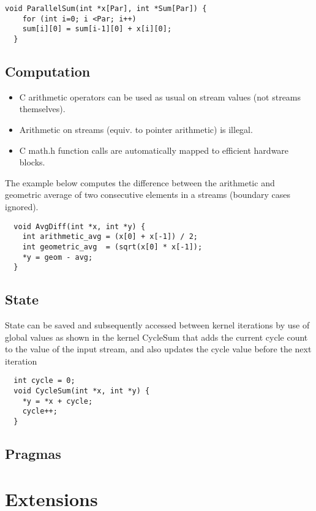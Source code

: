 \begin{lstlisting}[caption={Using loops for \FAST{} design parametrisation}]
  void ParallelSum(int *x[Par], int *Sum[Par]) {
    for (int i=0; i <Par; i++)
    sum[i][0] = sum[i-1][0] + x[i][0];
  }
\end{lstlisting}
\subsection{Computation}

\begin{itemize}

\item C arithmetic operators can be used as usual on stream values (not streams themselves).
\item Arithmetic on streams (equiv. to pointer arithmetic) is illegal.
\item C math.h function calls are automatically mapped to efficient hardware blocks.

\end{itemize}

The example below computes the difference between the arithmetic and geometric average of two consecutive elements in a streams (boundary cases ignored).


\begin{lstlisting}
  void AvgDiff(int *x, int *y) {
    int arithmetic_avg = (x[0] + x[-1]) / 2;
    int geometric_avg  = (sqrt(x[0] * x[-1]);
    *y = geom - avg;
  }
\end{lstlisting}

\subsection{State}
State can be saved and subsequently accessed between kernel iterations
by use of global values as shown in the kernel CycleSum that adds the
current cycle count to the value of the input stream, and also updates
the cycle value before the next iteration
\begin{lstlisting}
  int cycle = 0;
  void CycleSum(int *x, int *y) {
    *y = *x + cycle;
    cycle++;
  }
\end{lstlisting}

\subsection{Pragmas}

\section{Extensions}

